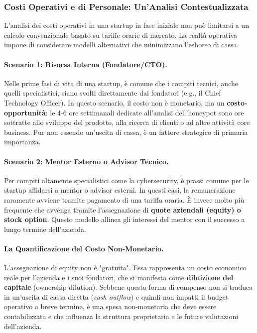 \subsubsection{Costi Operativi e di Personale: Un'Analisi Contestualizzata}
L'analisi dei costi operativi in una startup in fase iniziale non può limitarsi a un calcolo convenzionale basato su tariffe orarie di mercato. La realtà operativa impone di considerare modelli alternativi che minimizzano l'esborso di cassa.

\paragraph{Scenario 1: Risorsa Interna (Fondatore/CTO).} Nelle prime fasi di vita di una startup, è comune che i compiti tecnici, anche quelli specialistici, siano svolti direttamente dai fondatori (e.g., il Chief Technology Officer). In questo scenario, il costo non è monetario, ma un \textbf{costo-opportunità}: le 4-6 ore settimanali dedicate all'analisi dell'honeypot sono ore sottratte allo sviluppo del prodotto, alla ricerca di clienti o ad altre attività core business. Pur non essendo un'uscita di cassa, è un fattore strategico di primaria importanza.

\paragraph{Scenario 2: Mentor Esterno o Advisor Tecnico.} Per compiti altamente specialistici come la cybersecurity, è prassi comune per le startup affidarsi a mentor o advisor esterni. In questi casi, la remunerazione raramente avviene tramite pagamento di una tariffa oraria. È invece molto più frequente che avvenga tramite l'assegnazione di \textbf{quote aziendali (equity) o stock option}. Questo modello allinea gli interessi del mentor con il successo a lungo termine dell'azienda.

\paragraph{La Quantificazione del Costo Non-Monetario.} L'assegnazione di equity non è "gratuita". Essa rappresenta un costo economico reale per l'azienda e i suoi fondatori, che si manifesta come \textbf{diluizione del capitale} (ownership dilution). Sebbene questa forma di compenso non si traduca in un'uscita di cassa diretta (\textit{cash outflow}) e quindi non impatti il budget operativo a breve termine, è una spesa non-monetaria che deve essere contabilizzata e che influenza la struttura proprietaria e le future valutazioni dell'azienda.

